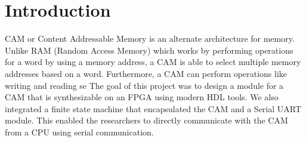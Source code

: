 \section{Introduction}
CAM or Content Addressable Memory is an alternate architecture for memory. Unlike RAM (Random Access Memory) which works by 
performing operations for a word by using a memory address, a CAM is able to select multiple memory addresses based on a word. Furthermore, a CAM can perform operations like writing and reading se 
The goal of this project was to design a module for a CAM that is synthesizable on an FPGA using modern HDL tools. 
We also integrated a finite state machine that encapsulated the CAM and a Serial UART module. 
This enabled the researchers to directly communicate with the CAM from a CPU using serial communication. 
